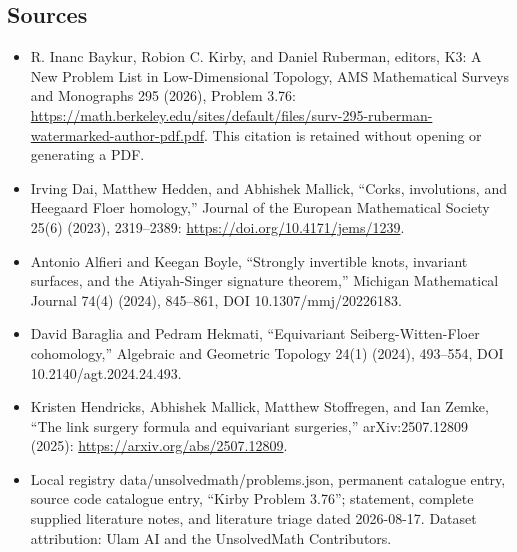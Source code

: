 \documentclass[11pt]{article}
\begin{document}
\subsection{Sources}
\begin{itemize}
\item R. Inanc Baykur, Robion C. Kirby, and Daniel Ruberman, editors, K3: A New Problem List in Low-Dimensional Topology, AMS Mathematical Surveys and Monographs 295 (2026), Problem 3.76: \url{https://math.berkeley.edu/sites/default/files/surv-295-ruberman-watermarked-author-pdf.pdf}. This citation is retained without opening or generating a PDF.
\item [DHM23] Irving Dai, Matthew Hedden, and Abhishek Mallick, ``Corks, involutions, and Heegaard Floer homology,'' Journal of the European Mathematical Society 25(6) (2023), 2319--2389: \url{https://doi.org/10.4171/jems/1239}.
\item [AB24b] Antonio Alfieri and Keegan Boyle, ``Strongly invertible knots, invariant surfaces, and the Atiyah-Singer signature theorem,'' Michigan Mathematical Journal 74(4) (2024), 845--861, DOI 10.1307/mmj/20226183.
\item [BH24a] David Baraglia and Pedram Hekmati, ``Equivariant Seiberg-Witten-Floer cohomology,'' Algebraic and Geometric Topology 24(1) (2024), 493--554, DOI 10.2140/agt.2024.24.493.
\item Kristen Hendricks, Abhishek Mallick, Matthew Stoffregen, and Ian Zemke, ``The link surgery formula and equivariant surgeries,'' arXiv:2507.12809 (2025): \url{https://arxiv.org/abs/2507.12809}.
\item Local registry data/unsolvedmath/problems.json, permanent catalogue entry, source code catalogue entry, ``Kirby Problem 3.76''; statement, complete supplied literature notes, and literature triage dated 2026-08-17. Dataset attribution: Ulam AI and the UnsolvedMath Contributors.
\end{itemize}
\end{document}
